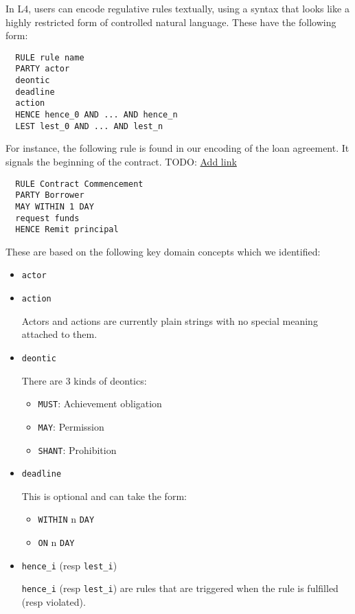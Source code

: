 \documentclass{article}
\begin{document}
In L4, users can encode regulative rules textually, using a syntax that looks
like a highly restricted form of controlled natural language.
These have the following form:
\begin{lstlisting}
  RULE rule name
  PARTY actor
  deontic
  deadline
  action
  HENCE hence_0 AND ... AND hence_n
  LEST lest_0 AND ... AND lest_n
\end{lstlisting}

For instance, the following rule is found in our encoding of the loan
agreement.
It signals the beginning of the contract.
TODO:
\href{
  https://docs.google.com/spreadsheets/d/1_k17mzk2hTyPY2egbEVqXzr8uYAdi6BVqeMYdBxKB_I/edit#gid=864296175
}{Add link}

\begin{lstlisting}
  RULE Contract Commencement
  PARTY Borrower
  MAY WITHIN 1 DAY
  request funds
  HENCE Remit principal
\end{lstlisting}

These are based on the following key domain concepts which we identified:
\begin{itemize}
  \item \texttt{actor}
  \item \texttt{action}

  Actors and actions are currently plain strings with no special meaning
  attached to them.
  
  \item \texttt{deontic}

  There are 3 kinds of deontics:
  \begin{itemize}
    \item \texttt{MUST}: Achievement obligation
    \item \texttt{MAY}: Permission
    \item \texttt{SHANT}: Prohibition
  \end{itemize}

  \item \texttt{deadline}

  This is optional and can take the form:
  \begin{itemize}
    \item \texttt{WITHIN} n \texttt{DAY}
    \item \texttt{ON} n \texttt{DAY}
  \end{itemize}

  \item \texttt{hence\_i} (resp \texttt{lest\_i})

  \texttt{hence\_i} (resp \texttt{lest\_i}) are rules that are triggered
  when the rule is fulfilled (resp violated).
\end{itemize}
\end{document}
